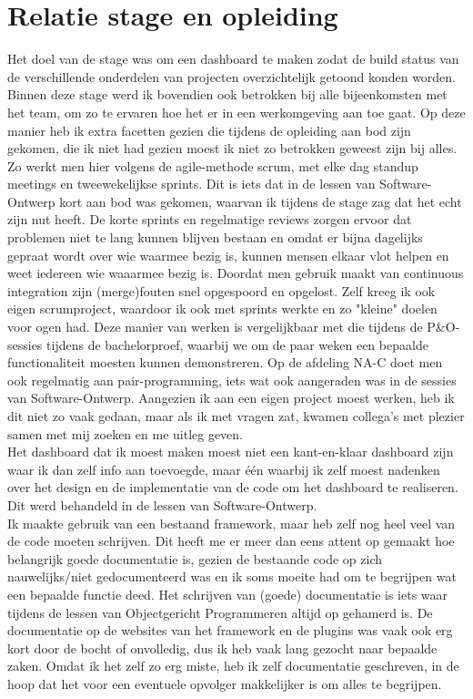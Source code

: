 \documentclass[10pt,a4paper]{article}
\begin{document}
\section{Relatie stage en opleiding}
\label{relatie}
Het doel van de stage was om een dashboard te maken zodat de build status van de verschillende onderdelen van projecten overzichtelijk getoond konden worden. Binnen deze stage werd ik bovendien ook betrokken bij alle bijeenkomsten met het team, om zo te ervaren hoe het er in een werkomgeving aan toe gaat. Op deze manier heb ik extra facetten gezien die tijdens de opleiding aan bod zijn gekomen, die ik niet had gezien moest ik niet zo betrokken geweest zijn bij alles. Zo werkt men hier volgens de agile-methode scrum, met elke dag standup meetings en tweewekelijkse sprints. Dit is iets dat in de lessen van Software-Ontwerp kort aan bod was gekomen, waarvan ik tijdens de stage zag dat het echt zijn nut heeft. De korte sprints en regelmatige reviews zorgen ervoor dat problemen niet te lang kunnen blijven bestaan en omdat er bijna dagelijks gepraat wordt over wie waarmee bezig is, kunnen mensen elkaar vlot helpen en weet iedereen wie waaarmee bezig is. Doordat men gebruik maakt van continuous integration zijn (merge)fouten snel opgespoord en opgelost. Zelf kreeg ik ook eigen scrumproject, waardoor ik ook met sprints werkte en zo "kleine" doelen voor ogen had. Deze manier van werken is vergelijkbaar met die tijdens de P\&O-sessies tijdens de bachelorproef, waarbij we om de paar weken een bepaalde functionaliteit moesten kunnen demonstreren. Op de afdeling NA-C doet men ook regelmatig aan pair-programming, iets wat ook aangeraden was in de sessies van Software-Ontwerp. Aangezien ik aan een eigen project moest werken, heb ik dit niet zo vaak gedaan, maar als ik met vragen zat, kwamen collega's met plezier samen met mij zoeken en me uitleg geven.\\
Het dashboard dat ik moest maken moest niet een kant-en-klaar dashboard zijn waar ik dan zelf info aan toevoegde, maar \'e\'en waarbij ik zelf moest nadenken over het design en de implementatie van de code om het dashboard te realiseren. Dit werd behandeld in de lessen van Software-Ontwerp.\\
Ik maakte gebruik van een bestaand framework, maar heb zelf nog heel veel van de code moeten schrijven. Dit heeft me er meer dan eens attent op gemaakt hoe belangrijk goede documentatie is, gezien de bestaande code op zich nauwelijks/niet gedocumenteerd was en ik soms moeite had om te begrijpen wat een bepaalde functie deed. Het schrijven van (goede) documentatie is iets waar tijdens de lessen van Objectgericht Programmeren altijd op gehamerd is. De documentatie op de websites van het framework en de plugins  was vaak ook erg kort door de bocht of onvolledig, dus ik heb vaak lang gezocht naar bepaalde zaken. Omdat ik het zelf zo erg miste, heb ik zelf documentatie geschreven, in de hoop dat het voor een eventuele opvolger makkelijker is om alles te begrijpen.\\
\end{document}
